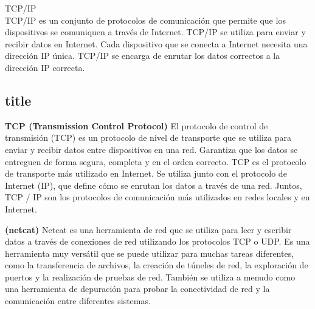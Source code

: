 \documentclass[../main.tex]{subfiles}
\begin{document}
        TCP/IP \\
        TCP/IP es un conjunto de protocolos de comunicación que permite que los dispositivos se comuniquen a través de Internet. TCP/IP se utiliza para enviar y recibir datos en Internet. Cada dispositivo que se conecta a Internet necesita una dirección IP única. TCP/IP se encarga de enrutar los datos correctos a la dirección IP correcta.

    \subsection{title}
        \begin{definition} \textbf{}
            
        \end{definition}


        \begin{definition} \textbf{TCP (Transmission Control Protocol)}
            El protocolo de control de transmisión (TCP) es un protocolo de nivel de transporte que se utiliza para enviar y recibir datos entre dispositivos en una red. Garantiza que los datos se entreguen de forma segura, completa y en el orden correcto. TCP es el protocolo de transporte más utilizado en Internet. Se utiliza junto con el protocolo de Internet (IP), que define cómo se enrutan los datos a través de una red. Juntos, TCP / IP son los protocolos de comunicación más utilizados en redes locales y en Internet.
        \end{definition}

        \begin{definition} \textbf{(netcat)} 
            Netcat es una herramienta de red que se utiliza para leer y escribir datos a través de conexiones de red utilizando los protocolos TCP o UDP. Es una herramienta muy versátil que se puede utilizar para muchas tareas diferentes, como la transferencia de archivos, la creación de túneles de red, la exploración de puertos y la realización de pruebas de red. También se utiliza a menudo como una herramienta de depuración para probar la conectividad de red y la comunicación entre diferentes sistemas.
        \end{definition}
\end{document}

